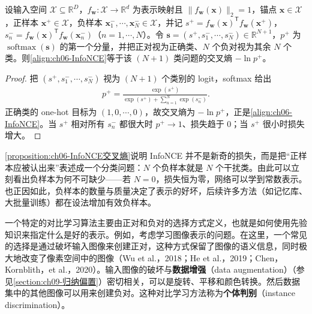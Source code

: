 \documentclass[../../main.tex]{subfiles}
\begin{document}
\begin{proposition}\label{proposition:ch06-InfoNCE交叉熵}
设输入空间 $\mathcal{X}\subseteq\mathbb{R}^{D}$，$f_{\boldsymbol{w}}:\mathcal{X}\to\mathbb{R}^{d}$ 为表示映射且 $\|f_{\boldsymbol{w}}(\boldsymbol{x})\|_{2}=1$，锚点 $\boldsymbol{x}\in\mathcal{X}$，正样本 $\boldsymbol{x}^{+}\in\mathcal{X}$，负样本 $\boldsymbol{x}_{1}^{-},\cdots,\boldsymbol{x}_{N}^{-}\in\mathcal{X}$，并记 $s^{+}=f_{\boldsymbol{w}}(\boldsymbol{x})^{\mathsf T}f_{\boldsymbol{w}}(\boldsymbol{x}^{+})$，$s_{n}^{-}=f_{\boldsymbol{w}}(\boldsymbol{x})^{\mathsf T}f_{\boldsymbol{w}}(\boldsymbol{x}_{n}^{-})$（$n=1,\cdots,N$）。令 $\boldsymbol{s}=(s^{+},s_{1}^{-},\cdots,s_{N}^{-})\in\mathbb{R}^{N+1}$，$p^{+}$ 为 $\operatorname{softmax}(\boldsymbol{s})$ 的第一个分量，并把正对视为正确类、$N$ 个负对视为其余 $N$ 个类。则\eqref{align:ch06-InfoNCE}等于该 $(N+1)$ 类问题的交叉熵 $-\ln p^{+}$。
\end{proposition}

\begin{proof}
把 $(s^{+},s_1^{-},\cdots,s_N^{-})$ 视为 $(N+1)$ 个类别的 logit，softmax 给出
\begin{align}
p^{+}=\frac{\exp(s^{+})}{\exp(s^{+})+\sum_{n=1}^{N}\exp(s_n^{-})}.
\end{align}
正确类的 one-hot 目标为 $(1,0,\cdots,0)$，故交叉熵为 $-\ln p^{+}$，正是\eqref{align:ch06-InfoNCE}。当 $s^{+}$ 相对所有 $s_n^{-}$ 都很大时 $p^{+}\to1$、损失趋于 $0$；当 $s^{+}$ 很小时损失增大。
\end{proof}

\begin{remark}\cref{proposition:ch06-InfoNCE交叉熵}说明 InfoNCE 并不是新奇的损失，而是把“正样本应被认出来”表述成一个分类问题：$N$ 个负样本就是 $N$ 个干扰类。由此可以立刻看出负样本为何不可缺少——若 $N=0$，损失恒为零，网络可以学到常数表示。也正因如此，负样本的数量与质量决定了表示的好坏，后续许多方法（如记忆库、大批量训练）都在设法增加有效负样本。
\end{remark}

一个特定的对比学习算法主要由正对和负对的选择方式定义，也就是如何使用先验知识来指定什么是好的表示。例如，考虑学习图像表示的问题。在这里，一个常见的选择是通过破坏输入图像来创建正对，这种方式保留了图像的语义信息，同时极大地改变了像素空间中的图像（Wu et al.，2018；He et al.，2019；Chen，Kornblith，et al.，2020）。输入图像的破坏与\textbf{数据增强}（data augmentation）（参见\cref{section:ch09-归纳偏置}）密切相关，可以是旋转、平移和颜色转换。然后数据集中的其他图像可以用来创建负对。这种对比学习方法称为\textbf{个体判别}（instance discrimination）。
\end{document}
